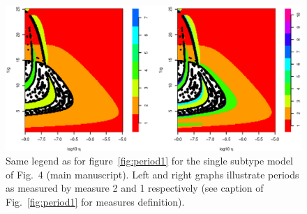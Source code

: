 \begin{figure}[htb]
  \center
    \includegraphics[width= 0.8 \linewidth]{texte/article2/graph_annexe/period_bestfit.eps}
    \caption{Same legend as for figure~\ref{fig:period1} for the
      single subtype model of Fig.~4 (main manuscript). Left and right
      graphs illustrate periods as measured by measure 2 and 1
      respectively (see caption of Fig.~\ref{fig:period1} for measures
      definition).}
  \label{fig:peiod1best}
\end{figure}

